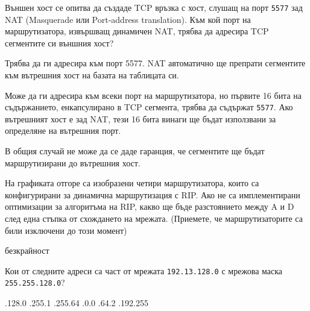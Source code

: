 \begin{questions}
  \question[7] Външен хост се опитва да създаде TCP връзка с хост, слушащ на
  порт \texttt{5577} зад NAT (\foreignlanguage{english}{Masquerade} или
  \foreignlanguage{english}{Port-address translation}). Към кой порт на
  маршрутизатора, извършващ динамичен NAT, трябва да адресира TCP сегментите си
  външния хост?

  \begin{choices}
    \choice Трябва да ги адресира към порт 5577. NAT автоматично ще препрати
    сегментите към вътрешния хост на базата на таблицата си.

    \choice Може да ги адресира към всеки порт на маршрутизатора, но първите 16
    бита на съдържанието, енкапсулирано в TCP сегмента, трябва да съдържат
    \texttt{5577}. Ако вътрешният хост е зад NAT, тези 16 бита винаги ще бъдат
    използвани за определяне на вътрешния порт.

    \CorrectChoice В общия случай не може да се даде гаранция, че сегментите ще
    бъдат маршрутизирани до вътрешния хост.
  \end{choices}

  \begin{center}
  \end{center}

  \question[7] На графиката отгоре са изобразени четири маршрутизатора, които са
  конфигурирани за динамична маршрутизация с RIP. Ако не са имплементирани
  оптимизации за алгоритъма на RIP, какво ще бъде разстоянието между A и
  D след една стъпка от схождането на мрежата. (Приемете, че маршрутизаторите са
  били изключени до този момент)

  \begin{oneparchoices}
    \CorrectChoice безкрайност
  \end{oneparchoices}

  \question[10] Кои от следните адреси са част от мрежата \texttt{192.13.128.0} с
  мрежова маска \texttt{255.255.128.0}?
  \begin{choices}
    .128.0
    .255.1
    .255.64
    .0.0
    .64.2
    .192.255
  \end{choices}


\end{questions}
